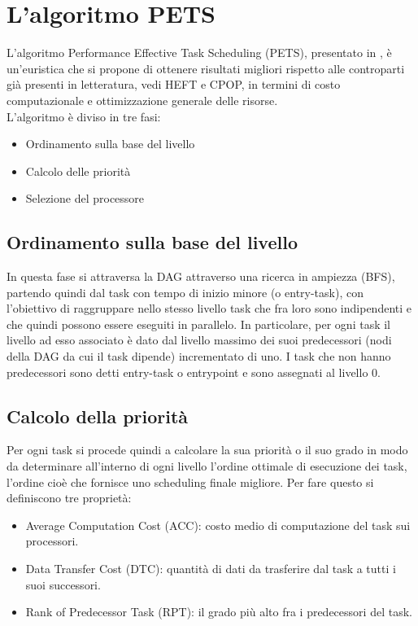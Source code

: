 \chapter{L'algoritmo PETS}
\vspace{4cm}
L'algoritmo Performance Effective Task Scheduling (PETS), presentato in \cite{ilavarasan2007low}, è un'euristica che si propone di ottenere risultati migliori rispetto alle controparti già presenti in letteratura, vedi HEFT\cite{993206} e CPOP\cite{993206}, in termini di costo computazionale e ottimizzazione generale delle risorse.
\\
L'algoritmo è diviso in tre fasi:
\begin{itemize}
	\item Ordinamento sulla base del livello
	\item Calcolo delle priorità
	\item Selezione del processore 
\end{itemize}

\newpage

\section{Ordinamento sulla base del livello}
In questa fase si attraversa la DAG attraverso una ricerca in ampiezza (BFS), partendo quindi dal task con tempo di inizio minore (o entry-task), con l'obiettivo di raggruppare nello stesso livello task che fra loro sono indipendenti e che quindi possono essere eseguiti in parallelo.
In particolare, per ogni task il livello ad esso associato è dato dal livello massimo dei suoi predecessori (nodi della DAG da cui il task dipende) incrementato di uno. I task che non hanno predecessori sono detti entry-task o entrypoint e sono assegnati al livello 0.


\section{Calcolo della priorità}
Per ogni task si procede quindi a calcolare la sua priorità o il suo grado in modo da determinare all'interno di ogni livello l'ordine ottimale di esecuzione dei task, l'ordine cioè che fornisce uno scheduling finale migliore.
Per fare questo si definiscono tre proprietà:
\begin{itemize}
	\item Average Computation Cost (ACC): costo medio di computazione del task sui processori.
	\item Data Transfer Cost (DTC): quantità di dati da trasferire dal task a tutti i suoi successori.
	\item Rank of Predecessor Task (RPT): il grado più alto fra i predecessori del task.
\end{itemize}

